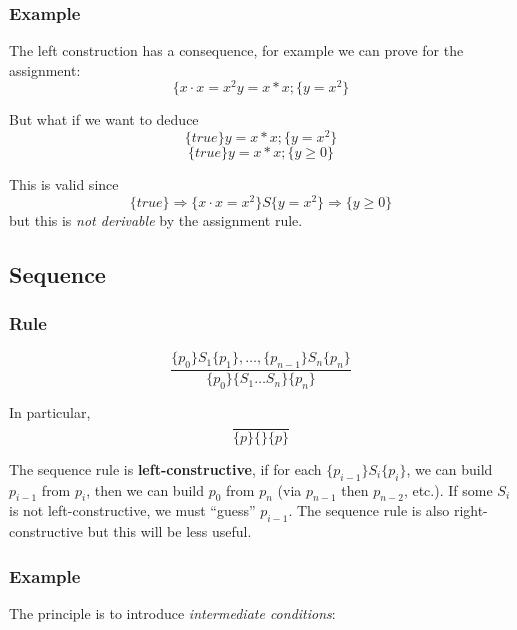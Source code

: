 \documentclass[12pt, a4paper]{book}
\begin{document}
    \subsubsection{Example}

    The left construction has a consequence, for example we can prove for the
    assignment:
    $$
    \{ x \cdot x = {x}^{2} y = x * x; \{ y = {x}^{2} \}
    $$

    But what if we want to deduce
    $$
    \{ true \} y = x*x; \{ y = {x}^{2} \}
    $$
    $$
    \{ true \} y = x*x; \{ y \ge 0 \}
    $$

    This is valid since
    $$
    \{ true \} \Rightarrow \{ x \cdot x = {x}^{2} \} S \{ y = {x}^{2} \} \Rightarrow \{ y \ge 0 \}
    $$
    but this is \textit{not derivable} by the assignment rule.

    \subsection{Sequence}

    \subsubsection{Rule}

    $$
    \frac{ \{ {p}_{0} \} {S}_{1} \{ {p}_{1} \}, \ldots, \{ {p}_{n-1} \} {S}_{n} \{ {p}_n \} }
    { \{ {p}_{0} \} \{ {S}_{1} \ldots {S}_{n} \} \{ {p}_{n} \} }
    $$

    In particular,
    $$
    \frac{}
    { \{ p \} \{ \} \{ p \} }
    $$

    The sequence rule is \textbf{left-constructive}, if for each
    $\{ {p}_{i-1}\} {S}_{i} \{ {p}_{i} \}$, we can build ${p}_{i-1}$ from ${p}_{i}$,
    then we can build ${p}_{0}$ from ${p}_{n}$ (via ${p}_{n-1}$ then ${p}_{n-2}$,
    etc.). If some ${S}_{i}$ is not left-constructive, we must \enquote{guess}
    ${p}_{i-1}$. The sequence rule is also right-constructive but this will be
    less useful.

    \subsubsection{Example}

    The principle is to introduce \textit{intermediate conditions}:
\end{document}
